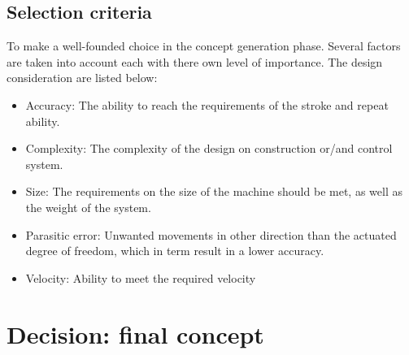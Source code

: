 \subsection{Selection criteria}
To make a well-founded choice in the concept generation phase. Several factors are taken into account each with there own level of importance. The design consideration are listed below: 

\begin{itemize}
    \item Accuracy: The ability to reach the requirements of the stroke and repeat ability.
    \item Complexity: The complexity of the design on construction or/and control system. 
    \item Size: The requirements on the size of the machine should be met, as well as the weight of the system.
    \item Parasitic error: Unwanted movements in other direction than the actuated degree of freedom, which in term result in a lower accuracy.
    \item Velocity: Ability to meet the required velocity 
    
\end{itemize}





\section{Decision: final concept}